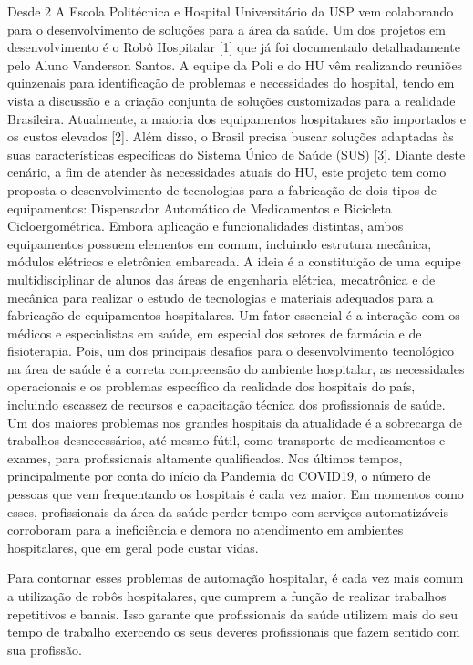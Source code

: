 \documentclass[../poliXuniversity_hospital_-USP-report.tex]{subfiles}
\begin{document}
 Desde 2
A Escola Politécnica e Hospital Universitário da USP vem colaborando para o desenvolvimento de soluções para a área da
saúde. Um dos projetos em desenvolvimento é o Robô Hospitalar [1] que já foi documentado detalhadamente pelo Aluno Vanderson Santos. A equipe da Poli
e do HU vêm realizando reuniões quinzenais para identificação de problemas e
necessidades do hospital, tendo em vista a discussão e a criação conjunta de soluções
customizadas para a realidade Brasileira. Atualmente, a maioria dos equipamentos hospitalares são
importados e os custos elevados [2]. Além disso, o Brasil precisa buscar soluções
adaptadas às suas características específicas do Sistema Único de Saúde (SUS) [3].
Diante deste cenário, a fim de atender às necessidades atuais do HU, este projeto tem
como proposta o desenvolvimento de tecnologias para a fabricação de dois tipos de
equipamentos: Dispensador Automático de Medicamentos e Bicicleta
Cicloergométrica. Embora aplicação e funcionalidades distintas, ambos equipamentos
possuem elementos em comum, incluindo estrutura mecânica, módulos elétricos e
eletrônica embarcada. A ideia é a constituição de uma equipe multidisciplinar de
alunos das áreas de engenharia elétrica, mecatrônica e de mecânica para realizar o
estudo de tecnologias e materiais adequados para a fabricação de equipamentos
hospitalares. Um fator essencial é a interação com os médicos e especialistas em
saúde, em especial dos setores de farmácia e de fisioterapia. Pois, um dos principais
desafios para o desenvolvimento tecnológico na área de saúde é a correta
compreensão do ambiente hospitalar, as necessidades operacionais e os problemas
específico da realidade dos hospitais do país, incluindo escassez de recursos e
capacitação técnica dos profissionais de saúde.
Um dos maiores problemas nos grandes hospitais da atualidade é a sobrecarga de trabalhos desnecessários, até mesmo fútil, como transporte de medicamentos e exames, para profissionais altamente qualificados. Nos últimos tempos, principalmente por conta do início da Pandemia do COVID19, o número de pessoas que vem frequentando os hospitais é cada vez maior. Em momentos como esses, profissionais da área da saúde perder tempo com serviços automatizáveis corroboram para a ineficiência e demora no atendimento em ambientes hospitalares, que em geral pode custar vidas.

Para contornar esses problemas de automação hospitalar, é cada vez mais comum a utilização de robôs hospitalares, que cumprem a função de realizar trabalhos repetitivos e banais. Isso garante que profissionais da saúde utilizem mais do seu tempo de trabalho exercendo os seus deveres profissionais que fazem sentido com sua profissão. 
\end{document}
